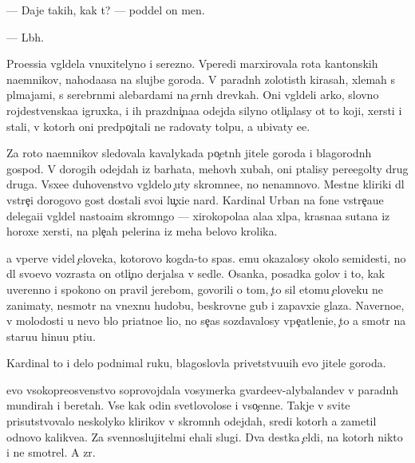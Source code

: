 \documentclass[10pt]{book}
\begin{document}
— Daje takih, kak t{\yi}? — poddel on men{\ia}.

— L{\iu}b{\yi}h.

Pro{\q}essi{\y}a v{\yi}gl{\ia}dela vnuxitelyno i ser{\y}ezno. Vperedi marxirovala rota kantonskih na{\y}emnikov, nahod{\ia}{\x}a{\y}asa na slujbe goroda. V paradn{\yi}h zolotist{\yi}h kirasah, xlemah s pl{\iu}majami, s serebr{\ia}n{\yi}mi alebardami na {\c}ern{\yi}h drevkah. Oni v{\yi}gl{\ia}deli {\y}arko, slovno rojdestvenska{\y}a igruxka, i ih prazdni{\c}na{\y}a odejda silyno otli{\c}alasy ot to{\y} koji, xersti i stali, v kotor{\yi}h oni predpo{\c}itali ne radovaty tolpu, a ubivaty {\y}e{\y}e.

Za roto{\y} na{\y}emnikov sledovala kavalykada po{\c}etn{\yi}h jitele{\y} goroda i blagorodn{\yi}h gospod. V dorogih odejdah iz barhata, mehov{\yi}h xubah, oni p{\yi}talisy pere{\x}egol{\ia}ty drug druga. V{\yi}sxe{\y}e duhovenstvo v{\yi}gl{\ia}delo {\c}uty skromne{\y}e, no nenamnovo. Mestn{\yi}{\y}e kliriki dl{\ia} vstre{\c}i dorogovo gost{\ia} dostali svo{\y}i lu{\c}xi{\y}e nar{\ia}d{\yi}. Kardinal Urban na fone vstre{\c}a{\y}u{\x}e{\y} delega{\q}i{\y}i v{\yi}gl{\ia}del nasto{\y}a{\x}im skromn{\ia}go{\y} — xirokopola{\y}a ala{\y}a xl{\ia}pa, krasna{\y}a sutana iz horoxe{\y} xersti, na ple{\c}ah pelerina iz meha belovo krolika.

{\Y}a vperv{\yi}{\y}e videl {\c}eloveka, kotorovo kogda-to spas. {\Y}emu okazalosy okolo semides{\ia}ti, no dl{\ia} svo{\y}evo vozrasta on otli{\c}no derjalsa v sedle. Osanka, posadka golov{\yi} i to, kak uverenno i spoko{\y}no on pravil jereb{\q}om, govorili o tom, {\c}to sil etomu {\c}eloveku ne zanimaty, nesmotr{\ia} na vnexn{\iu}{\y}u hudobu, beskrovn{\yi}{\y}e gub{\yi} i zapavxi{\y}e glaza. Naverno{\y}e, v molodosti u nevo b{\yi}lo pri{\y}atno{\y}e li{\q}o, no se{\y}{\c}as sozdavalosy vpe{\c}atleni{\y}e, {\c}to {\y}a smotr{\iu} na staru{\y}u hi{\x}nu{\y}u pti{\q}u.

Kardinal to i delo podnimal ruku, blagoslovl{\ia}{\y}a privetstvu{\y}u{\x}ih {\y}evo jitele{\y} goroda.

{\Y}evo v{\yi}sokopreosv{\ia}{\x}enstvo soprovojdala vosymerka gvarde{\y}{\q}ev-alybaland{\q}ev v paradn{\yi}h mundirah i beretah. Vse kak odin svetlovolos{\yi}{\y}e i v{\yi}so{\c}enn{\yi}{\y}e. Takje v svite prisutstvovalo neskolyko klirikov v skromn{\yi}h odejdah, sredi kotor{\yi}h {\y}a zametil odnovo kalikve{\q}a. Za sv{\ia}{\x}ennoslujitel{\ia}mi {\y}ehali slugi. Dva des{\ia}tka {\c}el{\ia}di, na kotor{\yi}h nikto i ne smotrel. A zr{\ia}.
\end{document}
